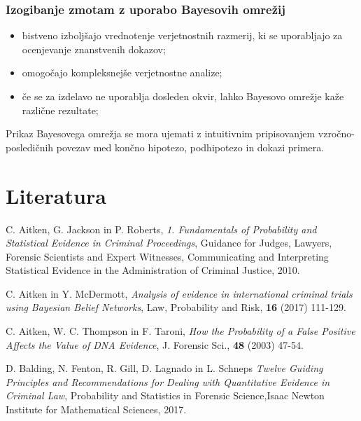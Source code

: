 \documentclass{beamer}
\begin{document}
\begin{frame}
    \frametitle{Izogibanje zmotam z uporabo Bayesovih omrežij}
    \begin{itemize}
        \item bistveno izboljšajo vrednotenje verjetnostnih razmerij, ki se uporabljajo za ocenjevanje znanstvenih dokazov;
        \item omogočajo kompleksnejše verjetnostne analize;
        \item če se za izdelavo ne uporablja dosleden okvir, lahko Bayesovo omrežje kaže različne rezultate;
    \end{itemize} \vspace{3mm}
    \begin{block}{}
        Prikaz Bayesovega omrežja se mora ujemati z intuitivnim pripisovanjem vzročno-posledičnih povezav med končno hipotezo, podhipotezo in dokazi primera.
    \end{block}
\end{frame}

\section{Literatura}

\begin{frame}
    \begin{thebibliography}{99}
            C. Aitken, G. Jackson in P. Roberts, \emph{1. Fundamentals of Probability and Statistical Evidence in Criminal Proceedings}, Guidance for Judges, Lawyers, Forensic Scientists and Expert Witnesses, Communicating and Interpreting Statistical Evidence in the Administration of Criminal Justice, 2010.
    
            C. Aitken in Y. McDermott, \emph{Analysis of evidence in international criminal trials using Bayesian Belief Networks}, Law, Probability and Risk, \textbf{16} (2017) 111-129.
    
            C. Aitken, W. C. Thompson in F. Taroni, \emph{How the Probability of a False Positive Affects the Value of DNA Evidence}, J. Forensic Sci., \textbf{48} (2003) 47-54.
    
            D. Balding, N. Fenton, R. Gill, D. Lagnado in L. Schneps \emph{Twelve Guiding Principles and Recommendations for Dealing with Quantitative Evidence in Criminal Law}, Probability and Statistics in Forensic Science,Isaac Newton Institute for Mathematical Sciences, 2017.
    \end{thebibliography}
\end{frame}
\end{document}

